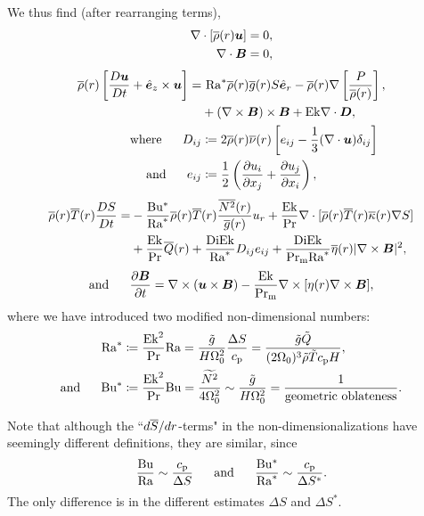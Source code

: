 \documentclass[12pt]{article}
\numberwithin{equation}{section}
\begin{document}
We thus find (after rearranging terms),
\begin{align}
	\nabla\cdot[\overline{\rho}(r)\bm{u}] &= 0\label{eq:contndrot},\\
	\nabla\cdot \bm{B} &= 0,
\end{align}
\begin{subequations}\label{eq:momndrot}
	\begin{align}
		\overline{\rho}(r)\left[\frac{D\bm{u}}{Dt} + \hat{\bm{e}}_z\times\bm{u}\right] = &\ {\rm{Ra}}^* \overline{\rho}(r)\overline{g}(r) S\hat{\bm{e}}_r         -\overline{\rho}(r)\nabla\left[ \frac{P}{\overline{\rho}(r)} \right], \nonumber\\
		&+(\nabla\times\bm{B})\times\bm{B} + {\rm{Ek}} \nabla\cdot\bm{D},\\
		\text{where}\ \ \ \ \  D_{ij} &\coloneqq 2\overline{\rho}(r)\overline{\nu}(r) \left[e_{ij} - \frac{1}{3}(\nabla\cdot\bm{u}) \delta_{ij} \right]\\
		\text{and}\ \ \ \ \  e_{ij} &\coloneqq \frac{1}{2}\left(\frac{\partial u_i}{\partial x_j} + \frac{\partial u_j}{\partial x_i} \right),
	\end{align}
\end{subequations}
\begin{align}\label{eq:enndrot}
	\overline{\rho}(r)\overline{T}(r) \frac{DS}{Dt} = &- \frac{{\rm{Bu^*}}}{{\rm{Ra}}^*} \overline{\rho}(r)\overline{T}(r) \frac{\overline{N^2}(r)}{\overline{g}(r)} u_r + \frac{{\rm{Ek}}}{{\rm{Pr}}} \nabla\cdot[\overline{\rho}(r) \overline{T}(r) \overline{\kappa}(r) \nabla S] \nonumber \\
	&+ \frac{{\rm{Ek}}}{{\rm{Pr}}} \overline{Q}(r) + \frac{{\rm{Di}}{\rm{Ek}}}{{\rm{Ra}}^*} D_{ij}e_{ij} + \frac{{\rm{Di}}{\rm{Ek}}}{{\rm{Pr_m}}{\rm{Ra}}^*} \overline{\eta}(r)|\nabla\times\bm{B}|^2,
\end{align}
\begin{align}\label{eq:indndrot}
	\text{and}\ \ \ \ \  \frac{\partial\bm{B}}{\partial t} = \nabla\times(\bm{u}\times\bm{B}) - \frac{{\rm{Ek}}}{{\rm{Pr_m}}} \nabla\times[\eta(r)\nabla\times\bm{B}],
\end{align}	
where we have introduced two modified non-dimensional numbers:
\begin{subequations}
	\begin{align}
		{\rm{Ra}}^* &\coloneqq \frac{{\rm{Ek}}^2}{{\rm{Pr}}}{\rm{Ra}} =  \frac{\tilde{g} }{H\Omega_0^2} \frac{\Delta S}{c_{\rm{p}}}=\frac{\tilde{g}\tilde{Q}}{(2\Omega_0)^3\tilde{\rho}\tilde{T}c_{\rm{p}} H},\\ 
		\text{and}\ \ \ \ \  {\rm{Bu^*}} &\coloneqq \frac{{\rm{Ek}}^2}{{\rm{Pr}}}{\rm{Bu}} = \frac{\widetilde{N^2}} {4\Omega_0^2} \sim \frac{\tilde{g} }{H\Omega_0^2} =  \frac{1}{\text{geometric\ oblateness}}.
	\end{align}
\end{subequations}

Note that although the ``$d\overline{S}/dr$-terms" in the non-dimensionalizations have seemingly different definitions, they are similar, since
\begin{align}
	\frac{{\rm{Bu}}}{{\rm{Ra}}} \sim \frac{c_{\rm{p}}}{\Delta S}\ \ \ \ \  \text{and}\ \ \ \ \  	\frac{{\rm{Bu^*}}}{{\rm{Ra}}^*} \sim \frac{c_{\rm{p}}}{\Delta S^*}.
\end{align}
The only difference is in the different estimates $\Delta S$ and $\Delta S^*$. 
\end{document}
